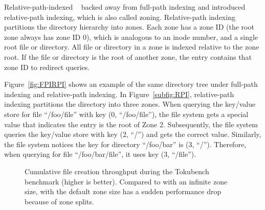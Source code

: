 Relative-path-indexed \betrfs~\citep{betrfs2,betrfs2tos} backed away from
full-path indexing and introduced relative-path indexing,
which is also called zoning.
Relative-path indexing partitions the directory hierarchy into zones.
Each zone has a zone ID (the root zone always has zone ID 0), which is analogous
to an inode number, and a single root file or directory.
All file or directory in a zone is indexed relative to the zone root.
If the file or directory is the root of another zone, the entry contains that
zone ID to redirect queries.

Figure~\ref{fig:FPIRPI} shows an example of the same directory tree under
full-path indexing and relative-path indexing.
In Figure~\ref{subfig:RPI}, relative-path indexing partitions the directory
into three zones.
When querying the key/value store for file ``/foo/file'' with key
(0, ``/foo/file''), the file system gets a special value that
indicates the entry is the root of Zone 2.
Subsequently, the file system queries the key/value store with key (2, ``/'')
and gets the correct value.
Similarly, the file system notices the key for directory ``/foo/bar'' is
(3, ``/'').
Therefore, when querying for file ``/foo/bar/file'', it uses key (3, ``/file'').

\newcommand{\addTokubenchZonePlot}[1]
{
    \addplot[
        color=\pgfkeysvalueof{/fs-colors/#1},
        line width=0.75pt,
        mark=\pgfkeysvalueof{/fs-marks/#1},
    ]
    plot[
    ]
    table[
    ]
    {./data/tokuzone/#1.csv};
    \addlegendentry{\pgfkeysvalueof{/fs-names/#1}}
}

\begin{figure}[t]
    \centering
    \caption[Zone maintainance cost in TokuBench benchmark]{
        Cumulative file creation throughput during the Tokubench benchmark (higher is better).
        Compared to \betrfsThree with an infinite zone size,
        \betrfsThree with the default zone size has a sudden
        performance drop because of zone splits.}
    \label{fig:tokuzone}
\end{figure}

